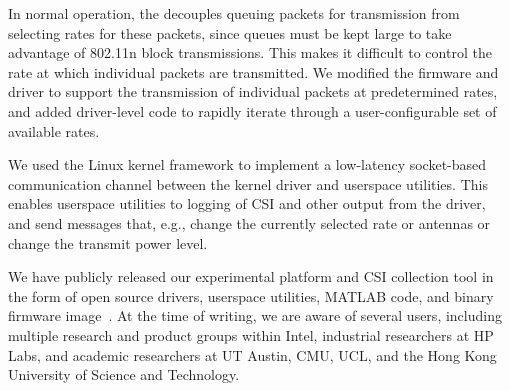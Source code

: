  In normal operation, the  decouples queuing packets for transmission from selecting rates for these packets, since queues must be kept large to take advantage of 802.11n block transmissions. This makes it difficult to control the rate at which individual packets are transmitted. We modified the firmware and driver to support the transmission of individual packets at predetermined rates, and added driver-level code to rapidly iterate through a user-configurable set of available rates.

 We used the Linux kernel  framework to implement a low-latency socket-based communication channel between the kernel driver and userspace utilities. This enables userspace utilities to logging of CSI and other output from the driver, and send messages that, e.g., change the currently selected rate or antennas or change the transmit power level.

 We have publicly released our experimental platform and CSI collection tool in the form of open source drivers, userspace utilities, MATLAB code, and binary firmware image~\cite{halperin_csitool}. At the time of writing, we are aware of several users, including multiple research and product groups within Intel, industrial researchers at HP Labs, and academic researchers at UT Austin, CMU, UCL, and the Hong Kong University of Science and Technology.


